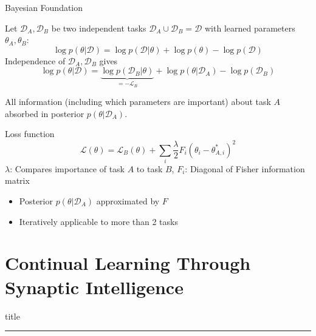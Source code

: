\documentclass{beamer}
\begin{document}
\begin{frame}{Bayesian Foundation}

Let $\mathcal D_A, \mathcal D_B$ be two \textcolor{oxfordblue}{independent} tasks $\mathcal D_A \cup \mathcal D_B = \mathcal D$ with learned parameters $\theta_A, \theta_B$:
\\
\begin{equation}
\log p(\theta|\mathcal D) = \log p(\mathcal D|\theta) + \log p (\theta) - \log p(\mathcal D)
\end{equation}
Independence of $\mathcal D_A, \mathcal D_B$ gives 
\begin{equation}
\log p(\theta|\mathcal D) = \underbrace{\log p(\mathcal D_B|\theta)}_{=- \mathcal L_B} + \log p(\theta|\mathcal D_A) - \log p(\mathcal D_B)
\end{equation}

All information (including which parameters are important) about task $A$ absorbed in posterior $p(\theta|\mathcal D_A)$.
\end{frame}
\begin{frame}{Loss function}
	\begin{equation}
	\mathcal L(\theta) = \mathcal L_B(\theta) + \sum_i \frac{\lambda}{2} F_i (\theta_i - \theta_{A,i}^*)^2
	\end{equation}
	$\lambda$: Compares importance of task $A$ to task $B$, $F_i$: Diagonal of Fisher information matrix
	\begin{itemize}
		\item<2-> Posterior $p(\theta|\mathcal D_A)$ approximated by $F$
		\item<3-> Iteratively applicable to more than 2 tasks
	\end{itemize}	
\end{frame}
\section{Continual Learning Through Synaptic Intelligence}
    \begin{frame}[plain]
        \vfill
      \centering
      \begin{beamercolorbox}[sep=8pt,center,shadow=true,rounded=true]{title}
        \insertsectionhead\par%
        \color{oxfordblue}\noindent\rule{10cm}{1pt}
      \end{beamercolorbox}
      \vfill
  \end{frame}
  
\end{document}
